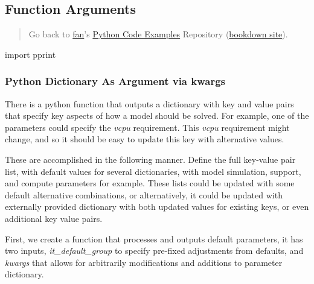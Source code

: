 \documentclass[
]{book}
\newenvironment{Shaded}{\begin{snugshade}}{\end{snugshade}}
\newcommand{\ImportTok}[1]{#1}
\newcommand{\NormalTok}[1]{#1}
\begin{document}
\hypertarget{function-arguments-1}{%
\subsection{Function Arguments}\label{function-arguments-1}}

\begin{quote}
Go back to \href{http://fanwangecon.github.io/}{fan}'s \href{https://fanwangecon.github.io/pyfan/}{Python Code Examples} Repository (\href{https://fanwangecon.github.io/pyfan/bookdown}{bookdown site}).
\end{quote}

\begin{Shaded}
\begin{Highlighting}[]
\ImportTok{import}\NormalTok{ pprint}
\end{Highlighting}
\end{Shaded}

\hypertarget{python-dictionary-as-argument-via-kwargs}{%
\subsubsection{Python Dictionary As Argument via kwargs}\label{python-dictionary-as-argument-via-kwargs}}

There is a python function that outputs a dictionary with key and value pairs that specify key aspects of how a model should be solved. For example, one of the parameters could specify the \emph{vcpu} requirement. This \emph{vcpu} requirement might change, and so it should be easy to update this key with alternative values.

These are accomplished in the following manner. Define the full key-value pair list, with default values for several dictionaries, with model simulation, support, and compute parameters for example. These lists could be updated with some default alternative combinations, or alternatively, it could be updated with externally provided dictionary with both updated values for existing keys, or even additional key value pairs.

First, we create a function that processes and outputs default parameters, it has two inputs, \emph{it\_default\_group} to specify pre-fixed adjustments from defaults, and \emph{kwargs} that allows for arbitrarily modifications and additions to parameter dictionary.
\end{document}
